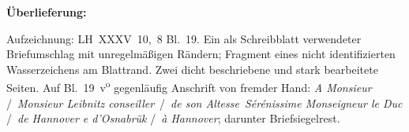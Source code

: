 %
%
%
%
%
\frenchspacing%
%
\begin{ledgroupsized}[r]{120mm}
\footnotesize
\pstart
\noindent\textbf{Überlieferung:}
\pend
\end{ledgroupsized}
\begin{ledgroupsized}[r]{114mm}
\footnotesize
\pstart \parindent -6mm
%
Aufzeichnung: LH~XXXV~10,~8 Bl.~19.
Ein als Schreibblatt verwendeter Briefumschlag mit unregelmäßigen Rändern;
Fragment eines nicht identifizierten Wasserzeichens am Blattrand.
Zwei dicht beschriebene und stark bearbeitete Seiten.
Auf Bl.~19~v\textsuperscript{o} gegenläufig Anschrift von fremder Hand:
\textit{A Monsieur} \lbrack/\rbrack\
\textit{Monsieur Leibnitz cons}\lbrack\textit{eiller}\rbrack\ \lbrack/\rbrack\
\textit{de son Alt}\lbrack\textit{esse}\rbrack\ \textit{S}\lbrack\textit{érénissi}\rbrack\textit{me M}\lbrack\textit{onsei}\rbrack\textit{g}\lbrack\textit{neu}\rbrack\textit{r le Duc} \lbrack/\rbrack\
\textit{de Hannover e d'Osnabrük} \lbrack/\rbrack\
\textit{à Hannover};
darunter Briefsiegelrest.
\pend
\end{ledgroupsized}
%
%
\vspace{5mm}
